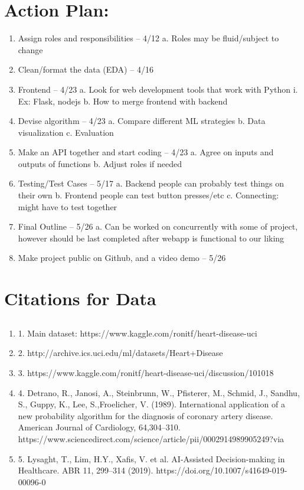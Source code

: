 \documentclass[12pt]{article}
\begin{document}
\section*{Action Plan: }
\begin{enumerate}
    \item Assign roles and responsibilities -- 4/12
    \subitem a. Roles may be fluid/subject to change
    \item Clean/format the data (EDA) -- 4/16
    \item Frontend -- 4/23
    \subitem a. Look for web development tools that work with Python 
    \subsubitem i. Ex: Flask, nodejs
    \subitem b. How to merge frontend with backend
    \item Devise algorithm -- 4/23
    \subitem a. Compare different ML strategies
    \subitem b. Data visualization
    \subitem c. Evaluation
    \item Make an API together and start coding -- 4/23
    \subitem a. Agree on inputs and outputs of functions
    \subitem b. Adjust roles if needed
    \item Testing/Test Cases -- 5/17
    \subitem a. Backend people can probably test things on their own
    \subitem b. Frontend people can test button presses/etc
    \subitem c. Connecting: might have to test together
    \item Final Outline -- 5/26
    \subitem a. Can be worked on concurrently with some of project, however should be last completed after webapp is functional to our liking
    \item Make project public on Github, and a video demo -- 5/26   
\end{enumerate}

\section*{Citations for Data}
\subsection*{}
\begin{enumerate}
    \item 1. Main dataset: https://www.kaggle.com/ronitf/heart-disease-uci
    \item 2. http://archive.ics.uci.edu/ml/datasets/Heart+Disease
    \item 3. https://www.kaggle.com/ronitf/heart-disease-uci/discussion/101018
    \item 4. Detrano, R., Janosi, A., Steinbrunn, W., Pfisterer, M., Schmid, J., 
    Sandhu, S., Guppy, K., Lee, S.,Froelicher, V. (1989). International 
    application of a new probability algorithm for the diagnosis of coronary 
    artery disease. American Journal of Cardiology, 64,304--310. 
    https://www.sciencedirect.com/science/article/pii/0002914989905249?via%
    \item 5. Lysaght, T., Lim, H.Y., Xafis, V. et al. AI-Assisted Decision-making in Healthcare. ABR 11, 299–314 (2019). https://doi.org/10.1007/s41649-019-00096-0
\end{enumerate}
\end{document}
